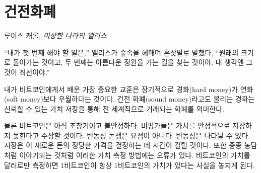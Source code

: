 \chapter{건전화폐}
\label{les:14}

\begin{chapquote}{루이스 캐롤, \textit{이상한 나라의 앨리스}}
\begin{comment}	
\enquote{The first thing I've got to do,} said Alice to herself, as she wandered about
in the wood, \enquote{is to grow to my right size, and the second thing is to find my
way into that lovely garden. I think that will be the best plan.}
\end{comment}
\enquote{내가 첫 번째 해야 할 일은,} 앨리스가 숲속을 헤매며 혼잣말로 말했다, \enquote{원래의 크기로 돌아가는 것이고, 
	두 번째는 아름다운 정원을 가는 길을 찾는 것이야. 내 생각엔 그것이 최선이야.}
\end{chapquote}

\begin{comment}	
The most important lesson I have learned from Bitcoin is that in the
long run, hard money is superior to soft money. Hard money, also
referred to as \textit{sound money}, is any globally traded currency that
serves as a reliable store of value.
\end{comment}
내가 비트코인에게서 배운 가장 중요한 교훈은 장기적으로 경화(hard money)가 연화(soft money)보다 우월하다는 것이다.
건전 화폐(sound money)라고도 불리는 경화는 신뢰할 수 있는 가치 저장을 통해 전 세계적으로 거래되는 화폐를 의미한다.

\begin{comment}	
Granted, Bitcoin is still young and volatile. Critics will say that it
does not store value reliably. The volatility argument is missing the
point. Volatility is to be expected. The market will take a while to
figure out the just price of this new money. Also, as is often jokingly
pointed out, it is grounded in an error of measurement. If you think in
dollars you will fail to see that one bitcoin will always be worth one
bitcoin.
\end{comment}
물론 비트코인은 아직 초창기이고 불안정하다. 
비평가들은 가치를 안정적으로 저장하지 못한다고 주장할 것이다.
변동성 논쟁은 요점이 아니다. 
변동성은 나타날 수 있다. 
시장은 이 새로운 돈의 정당한 가격을 결정하는 데 시간이 걸릴 것이다. 
또한 종종 농담처럼 이야기되는 것처럼 이러한 가치 측정 방법에는 오류가 있다. 
비트코인의 가치를 달러로만 측정하면 1비트코인이 항상 1비트코인의 가치가 있다는 사실을 놓치게 된다.

